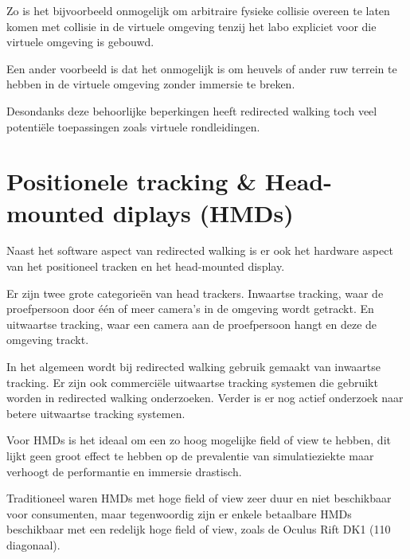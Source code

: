 Zo is het bijvoorbeeld onmogelijk om arbitraire fysieke collisie overeen te laten
komen met collisie in de virtuele omgeving tenzij het labo expliciet voor die
virtuele omgeving is gebouwd.

Een ander voorbeeld is dat het onmogelijk is om heuvels of ander ruw terrein te
hebben in de virtuele omgeving zonder immersie te breken.

Desondanks deze behoorlijke beperkingen heeft redirected walking toch veel
potenti\"ele toepassingen zoals virtuele rondleidingen.


\section{Positionele tracking \& Head-mounted diplays (HMDs)}
Naast het software aspect van redirected walking is er ook het hardware aspect
van het positioneel tracken en het head-mounted display.

Er zijn twee grote categorie\"en van head trackers. Inwaartse tracking, waar de
proefpersoon door \'e\'en of meer camera's in de omgeving wordt getrackt. En
uitwaartse tracking, waar een camera aan de proefpersoon hangt en deze de
omgeving trackt.

In het algemeen wordt bij redirected walking gebruik gemaakt van inwaartse 
tracking\cite{bruder08,engel08,steinicke09,kohn01,neth12,ward92}. Er zijn ook 
commerci\"ele uitwaartse tracking systemen die gebruikt worden in redirected
walking onderzoeken\cite{peck09,suma11}. Verder is er nog actief onderzoek naar
betere uitwaartse tracking systemen\cite{maesen13}.

Voor HMDs is het ideaal om een zo hoog mogelijke field of view te hebben, dit
lijkt geen groot effect te hebben op de prevalentie van 
simulatieziekte\cite{arthur00} maar verhoogt de performantie en immersie
drastisch\cite{arthur00}.

Traditioneel waren HMDs met hoge field of view zeer duur en niet beschikbaar voor
consumenten, maar tegenwoordig zijn er enkele betaalbare HMDs beschikbaar met een
redelijk hoge field of view, zoals de Oculus Rift DK1 (110\textdegree{} 
diagonaal).